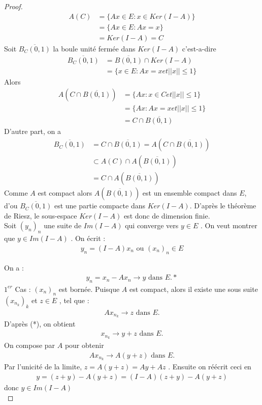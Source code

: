 \documentclass{report}
\begin{document}
{\begin{proof}
					\begin{align*}
					 A(C) &= \{Ax \in E : x \in Ker(I-A)\} \\
					 &= \{Ax \in E : Ax = x\} \\
					 &= Ker(I-A) = C 
					\end{align*}
	Soit $\overline{B_C(0,1)}$ la boule unité fermée dans $Ker(I - A)$ c'est-a-dire 
					\begin{align*}
					 \overline{B_C(0,1)} &= \overline{B(0,1)} \cap Ker(I-A) \\
					 &= \{x \in E : Ax = x et ||x|| \le 1\} 
					\end{align*}
	Alors 
					\begin{align*}
					 A(C\cap \overline{B(0,1)}) &= \{Ax : x \in C et ||x|| \le 1\} \\
					 &= \{Ax : Ax = x et ||x|| \le 1\} \\
					 &= C \cap \overline{B(0,1)} 
					\end{align*}
	D'autre part, on a 
					\begin{align*}
					 \overline{B_C(0,1)} &= C \cap \overline{B(0,1)} = A(C\cap\overline{B(0,1)}) \\ 
					 &\subset A(C) \cap A(\overline{B(0,1)}) \\
					 &= C\cap A(\overline{B(0,1)}) 
					\end{align*}
	Comme $A$ est compact alors $A(\overline{B(0,1)})$ est un ensemble compact dans $E$, d'ou $\overline{B_C(0,1)}$ est une partie compacte dans $Ker(I - A)$. D'après le théorème de Riesz, le sous-espace $Ker(I - A)$ est donc de dimension finie.\\
   Soit $(y_n)_n$ une suite de $Im(I - A)$ qui converge vers $y \in E$ . On veut montrer que $y \in Im(I-A)$ . On écrit : 
					\begin{align*}
					 y_n = (I - A)x_n \,\,\text{ou}\,\, (x_n)_n \in E 
					\end{align*}




	On a :
					\begin{align*}
					 y_n = x_n -Ax_n \rightarrow y \,\,\text{dans}\,\, E. 			*  
					\end{align*}
	 $1^{er}$ Cas : $(x_n)_n$ est bornée. Puisque $A$ est compact, alors il existe une sous suite $(x_{n_k})_k$ et $z \in E$ , tel que : 
					\begin{align*}
	 				 A x_{n_k} \rightarrow z \,\,\text{dans}\,\, E.
					\end{align*}
	 D'après (*), on obtient 
					\begin{align*}
	 				 x_{n_k} \rightarrow y+z \,\,\text{dans}\,\, E.
					\end{align*}
	 On compose par $A$ pour obtenir 
					\begin{align*}
	 				 Ax_{n_k} \rightarrow A(y+z) \,\,\text{dans}\,\, E.
					\end{align*}
	 Par l'unicité de la limite, $z = A(y+z) = Ay + Az$ . Ensuite on réécrit ceci en 
					\begin{align*}
	 				 y = (z+y) - A(y+z) = (I-A)(z+y) - A(y+z) 
					\end{align*}
	 donc $y \in Im(I-A)$ \\


\end{proof}}
\end{document}
